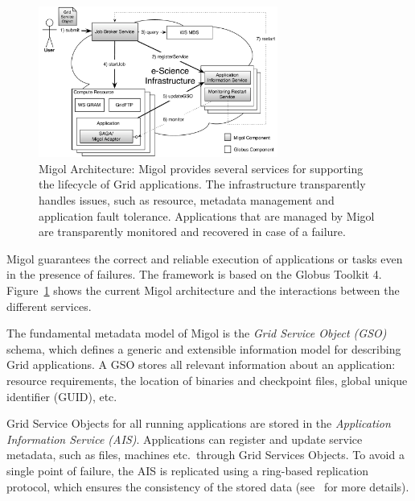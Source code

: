 \documentclass[times, 10pt,twocolumn]{article}
\begin{document}
\label{sec:migol}

\begin{figure}[t]
            \centering
                \includegraphics[width=0.7\textwidth]{migol_architecture}
            \caption{Migol Architecture: Migol provides several services for supporting the lifecycle of Grid applications. The infrastructure transparently handles issues, such as resource, metadata management and application fault tolerance.  Applications that are managed by Migol are transparently monitored and recovered in case of a failure.}
            \label{fig:migol_architecture} 
\end{figure}           


Migol guarantees the correct and reliable exe\-cution of applications or tasks even in
the presence of  failures. The framework is based on the Globus Toolkit 4. 
Figure~\ref{fig:migol_architecture} shows the current Migol architecture and 
the interactions between the different services.

The fundamental metadata model of Migol is the \emph{Grid Service Object (GSO)} schema,
which defines a generic and extensible information model for
describing Grid applications.  
A GSO stores all relevant information about an application: resource requirements,
the location of binaries and checkpoint files, global unique identifier (GUID),
etc.

Grid Service Objects for all running applications are stored in 
the {\em Application Information Service (AIS)}. 
Applications can register and update service metadata, 
such as files, machines etc.\ through Grid Services Objects. 
To avoid a single point of failure, the AIS is replicated using a ring-based
replication protocol, which ensures  the consistency of the stored data
(see~\cite{Luckow:2008ys} for more details).
\end{document}
